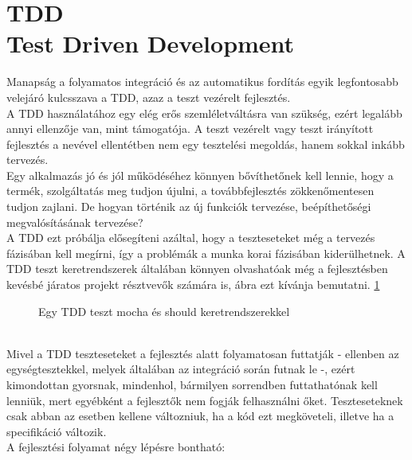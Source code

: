 \section{TDD\\\small{Test Driven Development}}
Manapság a folyamatos integráció és az automatikus fordítás egyik legfontosabb velejáró kulcsszava a TDD, azaz a teszt vezérelt fejlesztés.
\\
A TDD használatához egy elég erős szemléletváltásra van szükség, ezért legalább annyi ellenzője van, mint támogatója. A teszt vezérelt vagy teszt irányított fejlesztés a nevével ellentétben nem egy tesztelési megoldás, hanem sokkal inkább tervezés. \cite{tddjs_definition}
\\
Egy alkalmazás jó és jól működéséhez könnyen bővíthetőnek kell lennie, hogy a termék, szolgáltatás meg tudjon újulni, a továbbfejlesztés zökkenőmentesen tudjon zajlani. De hogyan történik az új funkciók tervezése, beépíthetőségi megvalósításának tervezése?
\\
A TDD ezt próbálja elősegíteni azáltal, hogy a teszteseteket még a tervezés fázisában kell megírni, így a problémák a munka korai fázisában kiderülhetnek. A TDD teszt keretrendszerek általában könnyen olvashatóak még a fejlesztésben kevésbé járatos projekt résztvevők számára is,  ábra ezt kívánja bemutatni.
\ref{fig:mocha_should_tdd_test}
\begin{figure}[ht]
	\centering
		
		\caption{Egy TDD teszt mocha és should keretrendszerekkel}
		\label{fig:mocha_should_tdd_test}
\end{figure}
\\
Mivel a TDD teszteseteket a fejlesztés alatt folyamatosan futtatják - ellenben az egységtesztekkel, melyek általában az integráció során futnak le -, ezért kimondottan gyorsnak, mindenhol, bármilyen sorrendben futtathatónak kell lenniük, mert egyébként a fejlesztők nem fogják felhasználni őket. Teszteseteknek csak abban az esetben kellene változniuk, ha a kód ezt megköveteli, illetve ha a specifikáció változik.
\\
A fejlesztési folyamat négy lépésre bontható:
\hfill\\
